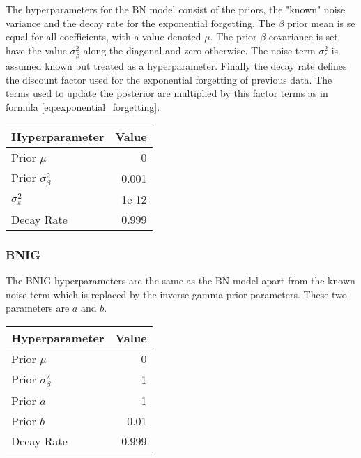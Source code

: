 {{The hyperparameters for the BN model consist of the priors, the "known" noise variance and the decay rate for the exponential forgetting. The $\beta$ prior mean is se equal for all coefficients, with a value denoted $\mu$. The prior $\beta$ covariance is set have the value $\sigma^2_\beta$ along the diagonal and zero otherwise. The noise term $\sigma^2_\varepsilon$ is assumed known but treated as a hyperparameter. Finally the decay rate defines the discount factor used for the exponential forgetting of previous data. The terms used to update the posterior are multiplied by this factor terms as in formula \ref{eq:exponential_forgetting}.

\begin{table}[H]
    \centering
    \begin{tabular}{@{}lr@{}}
        \toprule
        Hyperparameter               & Value \\ \midrule
        Prior $\mu$                  & 0     \\
        Prior $\sigma_\beta^2$       & 0.001 \\
        $\sigma^2_\varepsilon$       & 1e-12 \\
        Decay Rate                   & 0.999 \\ \bottomrule
        \end{tabular}
\end{table}

\subsubsection{BNIG}

The BNIG hyperparameters are the same as the BN model apart from the known noise term which is replaced by the inverse gamma prior parameters. These two parameters are $a$ and $b$.

\begin{table}[H]
    \centering
    \begin{tabular}{@{}lr@{}}
        \toprule
        Hyperparameter               & Value \\ \midrule
        Prior $\mu$                  & 0     \\
        Prior $\sigma_\beta^2$       & 1 \\
        Prior $a$                    & 1 \\
        Prior $b$                    & 0.01\\
        Decay Rate                   & 0.999 \\ \bottomrule
        \end{tabular}
\end{table}


}}
